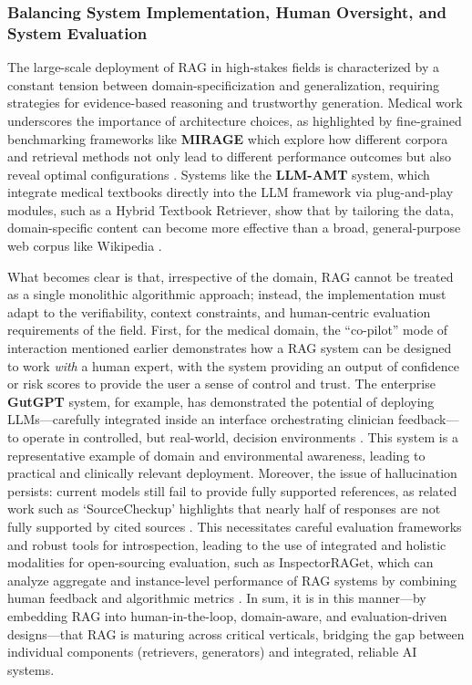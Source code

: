 \documentclass[11pt]{article}
\begin{document}
\subsubsection{Balancing System Implementation, Human Oversight, and System Evaluation}

The large-scale deployment of RAG in high-stakes fields is characterized by a constant tension between domain-specificization and generalization, requiring strategies for evidence-based reasoning and trustworthy generation. Medical work underscores the importance of architecture choices, as highlighted by fine-grained benchmarking frameworks like \textbf{MIRAGE} which explore how different corpora and retrieval methods not only lead to different performance outcomes but also reveal optimal configurations \cite{ref27}. Systems like the \textbf{LLM-AMT} system, which integrate medical textbooks directly into the LLM framework via plug-and-play modules, such as a Hybrid Textbook Retriever, show that by tailoring the data, domain-specific content can become more effective than a broad, general-purpose web corpus like Wikipedia \cite{ref391}.

What becomes clear is that, irrespective of the domain, RAG cannot be treated as a single monolithic algorithmic approach; instead, the implementation must adapt to the verifiability, context constraints, and human-centric evaluation requirements of the field. First, for the medical domain, the ``co-pilot'' mode of interaction mentioned earlier demonstrates how a RAG system can be designed to work \emph{with} a human expert, with the system providing an output of confidence or risk scores to provide the user a sense of control and trust. The enterprise \textbf{GutGPT} system, for example, has demonstrated the potential of deploying LLMs---carefully integrated inside an interface orchestrating clinician feedback---to operate in controlled, but real-world, decision environments \cite{ref392}. This system is a representative example of domain and environmental awareness, leading to practical and clinically relevant deployment. Moreover, the issue of hallucination persists: current models still fail to provide fully supported references, as related work such as `SourceCheckup' highlights that nearly half of responses are not fully supported by cited sources \cite{ref393}. This necessitates careful evaluation frameworks and robust tools for introspection, leading to the use of integrated and holistic modalities for open-sourcing evaluation, such as InspectorRAGet, which can analyze aggregate and instance-level performance of RAG systems by combining human feedback and algorithmic metrics \cite{ref394}. In sum, it is in this manner---by embedding RAG into human-in-the-loop, domain-aware, and evaluation-driven designs---that RAG is maturing across critical verticals, bridging the gap between individual components (retrievers, generators) and integrated, reliable AI systems.
\end{document}
